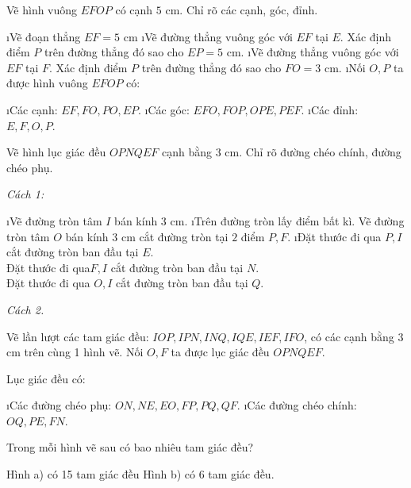 \begin{bt}
	Vẽ hình vuông $EFOP$ có cạnh $5$ cm. Chỉ rõ các cạnh, góc, đỉnh.
	\begin{loigiaichuong34}
		\begin{enumerate}[Bước 1:, leftmargin=*]
			\i Vẽ đoạn thẳng $EF = 5$ cm 
			\i Vẽ đường thẳng vuông góc với $EF$  tại $E$. Xác định điểm $P$  trên đường thẳng đó sao cho $EP = 5$ cm. 
			\i Vẽ đường thẳng vuông góc với $EF$  tại $F$.  Xác định điểm $P$  trên đường thẳng đó sao cho $FO = 3$ cm. 
			\i Nối $O,P$  ta được hình vuông  $EFOP$ có:
			\begin{enumerate}[--, leftmargin=*]
				\i Các cạnh: $EF, FO, PO, EP$. 
				\i Các góc: $EFO, FOP, OPE, PEF$. 
				\i Các đỉnh: $E,F,O,P$.
			\end{enumerate} 
		\end{enumerate}
	\end{loigiaichuong34}
\end{bt} 
\begin{bt}
	Vẽ hình lục giác đều $OPNQEF$ cạnh bằng $3$ cm. Chỉ rõ đường chéo chính, đường chéo phụ.
	\begin{loigiaichuong34}
		\textit{Cách 1:}
		\begin{enumerate}[Bước 1:, leftmargin=*]
			\i Vẽ đường tròn tâm $I$  bán kính $3$ cm. 
			\i Trên đường tròn lấy điểm  bất kì. Vẽ đường tròn tâm $O$ bán kính $3$ cm cắt đường tròn tại $2$ điểm $P, F$. 
			\i Đặt thước đi qua $P,I$ cắt đường tròn ban đầu tại $E$.\\  
			Đặt thước đi qua$F,I$  cắt đường tròn ban đầu tại $N$.\\ 
			Đặt thước đi qua $O,I$ cắt đường tròn ban đầu tại $Q$. 
		\end{enumerate}
		\textit{Cách 2.}
		
		Vẽ lần lượt các tam giác đều: $IOP, IPN, INQ, IQE, IEF, IFO$, có các cạnh bằng 3 cm trên cùng 1 hình vẽ. Nối $O,F$ ta được lục giác đều $OPNQEF$.
		 
		Lục giác đều  có: 
		\begin{enumerate}[--, leftmargin=*]
			\i Các đường chéo phụ: $ON, NE, EO, FP, PQ, QF$. 
			\i Các đường chéo chính: $OQ, PE, FN$.
		\end{enumerate}             
	\end{loigiaichuong34}
\end{bt}
\begin{bt}
	Trong mỗi hình vẽ sau có bao nhiêu tam giác đều? 
	\begin{loigiaichuong34}
		Hình a) có 15 tam giác đều
		Hình b) có 6 tam giác đều.
	\end{loigiaichuong34}
\end{bt}
